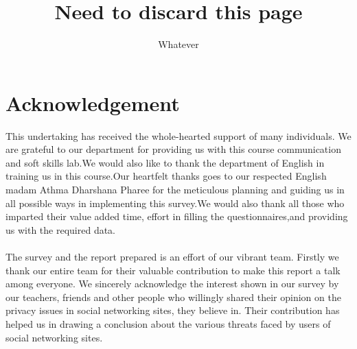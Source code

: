\documentclass[11pt]{book}
\begin{document}
\pagestyle{empty}
\title{\textbf{Need to discard this page}}
\author{Whatever}



\maketitle





\pagestyle{fancy}
\fontsize{25pt}{20pt}\selectfont
\fancyhf{}
\lhead[]{\thepage}
\rhead[\thepage]{}


\doublespacing



\chapter*{Acknowledgement}

This undertaking has received the whole-hearted support of many individuals. We are grateful to our department for providing us with this course communication and soft skills lab.We would also like to thank the department of English in training us in this course.Our heartfelt thanks goes to our respected English madam Athma Dharshana Pharee for the meticulous planning and guiding us in all possible ways in implementing this survey.We would also thank all those who imparted their value added time, effort in filling the questionnaires,and providing us with the required  data.
\\\\
The survey and the report prepared is an effort of our vibrant team. Firstly we  thank our entire team for their valuable contribution to make this report a talk among everyone.
We sincerely acknowledge the interest shown in our survey by our teachers, friends and other people who willingly shared their opinion on the privacy issues in social networking sites, they believe in. Their contribution has helped us in drawing a conclusion about the various threats faced by users of social networking sites.
\newpage
\thispagestyle{empty}
\end{document}
